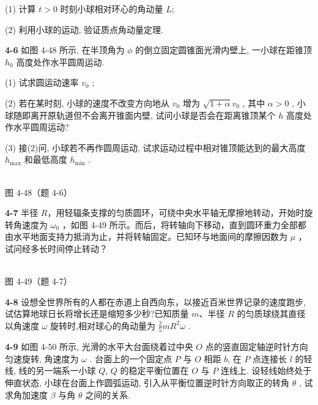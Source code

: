 (1) 计算 $t>0$ 时刻小球相对环心的角动量 $L$;

(2) 利用小球的运动, 验证质点角动量定理.

\newpage

\textbf{4-6} 如图 4-48 所示, 在半顶角为 $\phi$ 的倒立固定圆锥面光滑内壁上, 一小球在距锥顶 $h_{0}$ 高度处作水平圆周运动.

(1) 试求圆运动速率 $v_{0}$ ;

(2) 若在某时刻, 小球的速度不改变方向地从 $v_{0}$ 增为 $\sqrt{1 + \alpha} v_{0}$ , 其中 $\alpha > 0$ , 小球随即离开原轨道但不会离开锥面内壁, 试问小球是否会在距离锥顶某个 $h$ 高度处作水平圆周运动?

(3) 接(2)问, 小球若不再作圆周运动, 试求运动过程中相对锥顶能达到的最大高度 $h_{\max}$ 和最低高度 $h_{\min}$ .

\begin{center}
\resizebox{0.41\textwidth}{!}{}\\[4pt]
{\small 图 4-48（题 4-6）}
\end{center}

\newpage

\textbf{4-7} 半径 $R$，用轻辐条支撑的匀质圆环，可绕中央水平轴无摩擦地转动，开始时旋转角速度为 $\omega_{0}$ ，如图 4-49 所示。而后，将转轴向下移动，直到圆环重力全部都由水平地面支持力抵消为止，并将转轴固定。已知环与地面间的摩擦因数为 $\mu$ ，试问经多长时间停止转动？

\begin{center}
\resizebox{0.40\textwidth}{!}{}\\[4pt]
{\small 图 4-49（题 4-7）}
\end{center}

\newpage

\textbf{4-8} 设想全世界所有的人都在赤道上自西向东，以接近百米世界记录的速度跑步,试估算地球日长将增长还是缩短多少秒?已知质量 $m$、半径 $R$ 的匀质球绕其直径以角速度 $\omega$ 旋转时,相对球心的角动量为 $\frac{2}{5}mR^{2}\omega$ .

\newpage

\textbf{4-9} 如图 4-50 所示, 光滑的水平大台面绕着过中央 $O$ 点的竖直固定轴逆时针方向匀速旋转, 角速度为 $\omega$ . 台面上的一个固定点 $P$ 与 $O$ 相距 $b$, 在 $P$ 点连接长 $l$ 的轻线, 线的另一端系一小球 $Q$, $Q$ 的稳定平衡位置在 $O$ 与 $P$ 连线上. 设轻线始终处于伸直状态, 小球在台面上作圆弧运动, 引入从平衡位置逆时针方向取正的转角 $\theta$ , 试求角加速度 $\beta$ 与角 $\theta$ 之间的关系.

